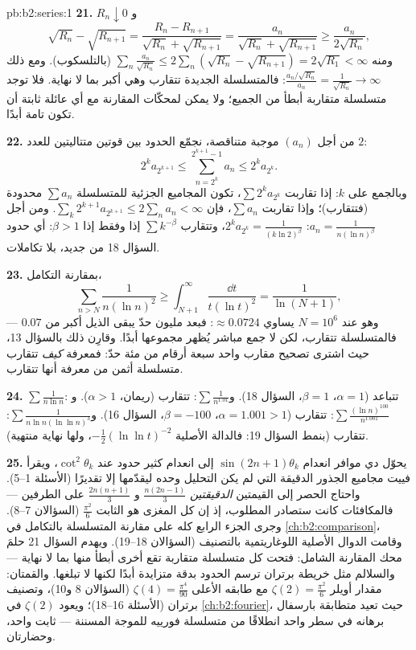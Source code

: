\begin{solution}{pb:b2:series:1}
\textbf{21.} $R_n \downarrow 0$ و
\[
\sqrt{R_n} - \sqrt{R_{n+1}} = \frac{R_n -
R_{n+1}}{\sqrt{R_n} + \sqrt{R_{n+1}}} =
\frac{a_n}{\sqrt{R_n} + \sqrt{R_{n+1}}} \geq
\frac{a_n}{2\sqrt{R_n}},
\]
ومنه $\sum_n \frac{a_n}{\sqrt{R_n}} \leq 2\sum_n(\sqrt{R_n} -
\sqrt{R_{n+1}}) = 2\sqrt{R_1} < \infty$ (بالتلسكوب). ومع ذلك
$\frac{a_n/\sqrt{R_n}}{a_n} = \frac1{\sqrt{R_n}} \to \infty$:
فالمتسلسلة الجديدة تتقارب وهي أكبر بما لا نهاية. فلا توجد
متسلسلة متقاربة أبطأ من الجميع؛ ولا يمكن لمحكّات المقارنة
مع أي عائلة ثابتة أن تكون تامة أبدًا.

\textbf{22.} من أجل $(a_n)$ موجبة متناقصة، نجمّع الحدود
بين قوتين متتاليتين للعدد $2$:
\[
2^{k}a_{2^{k+1}} \leq \sum_{n=2^k}^{2^{k+1}-1} a_n \leq
2^ka_{2^k} .
\]
وبالجمع على $k$: إذا تقاربت $\sum 2^ka_{2^k}$، تكون المجاميع
الجزئية للمتسلسلة $\sum a_n$ محدودة (فتتقارب)؛ وإذا تقاربت $\sum a_n$،
فإن $\sum_k 2^{k+1}a_{2^{k+1}} \leq 2\sum_n a_n <
\infty$. ومن أجل $a_n = \frac1{n(\ln n)^\beta}$: $2^ka_{2^k} =
\frac{1}{(k\ln 2)^\beta}$، وتتقارب $\sum k^{-\beta}$ إذا وفقط إذا
$\beta > 1$: أي حدود السؤال 18 من جديد، بلا
تكاملات.

\textbf{23.} بمقارنة التكامل،
\[
\sum_{n > N}\frac{1}{n(\ln n)^2} \geq
\int_{N+1}^{\infty}\frac{\dd t}{t(\ln t)^2} =
\frac{1}{\ln(N+1)},
\]
وهو عند $N = 10^6$ يساوي $\approx 0.0724$: فبعد مليون حدّ
يبقى الذيل أكبر من $0.07$ --- فالمتسلسلة تتقارب، لكن لا
جمع مباشر يُظهر مجموعها أبدًا. وقارِن ذلك بالسؤال
13، حيث اشترى تصحيح مقارب واحد سبعة
أرقام من مئة حدّ: فمعرفة \emph{كيف} تتقارب متسلسلة
أثمن من معرفة أنها تتقارب.

\textbf{24.} $\sum\frac1{n\ln n}$: تتباعد ($\alpha = 1$،
$\beta = 1$، السؤال 18). و$\sum\frac1{n^{1.01}}$: تتقارب
(ريمان، $\alpha > 1$). و$\sum\frac{(\ln n)^{100}}{n^{1.001}}$:
تتقارب ($\alpha = 1.001 > 1$، $\beta = -100$، السؤال 16).
و$\sum\frac1{n\ln n(\ln\ln n)^3}$: تتقارب (بنمط السؤال 19:
فالدالة الأصلية $-\frac12(\ln\ln t)^{-2}$، ولها نهاية
منتهية).

\textbf{25.} يحوّل دي موافر انعدام $\sin(2n{+}1)
\theta_k$ إلى انعدام كثير حدود عند
$\cot^2\theta_k$، ويقرأ فييت مجاميع الجذور الدقيقة التي لم يكن
التحليل وحده ليقدّمها إلا تقديرًا (الأسئلة 1--5). واحتاج
الحصر إلى القيمتين \emph{الدقيقتين} $\frac{n(2n-1)}3$ و
$\frac{2n(n+1)}3$ على الطرفين --- فالمكافئات كانت
ستصادر المطلوب، إذ إن كل المغزى هو الثابت
$\frac{\pi^2}6$ (السؤالان 7--8). وجرى الجزء الرابع كله على
مقارنة المتسلسلة بالتكامل في \cref{ch:b2:comparison}، وقامت
الدوال الأصلية اللوغاريتمية بالتصنيف (السؤالان
18--19). ويهدم السؤال 21 حلمَ محك المقارنة
الشامل: فتحت كل متسلسلة متقاربة تقع أخرى
أبطأ منها بما لا نهاية --- والسلالم مثل خريطة برتران ترسم الحدود
بدقة متزايدة أبدًا لكنها لا تبلغها. والقمتان: مقدار أويلر $\zeta(2)
= \frac{\pi^2}6$ مع طابقه الأعلى $\zeta(4) =
\frac{\pi^4}{90}$ (السؤالان 8 و10)، وتصنيف
برتران (الأسئلة 16--18)؛ ويعود $\zeta(2)$ في
\cref{ch:b2:fourier}، حيث تعيد متطابقة بارسفال برهانه
في سطر واحد انطلاقًا من متسلسلة فورييه للموجة المسننة --- ثابت
واحد، وحضارتان.
\end{solution}
